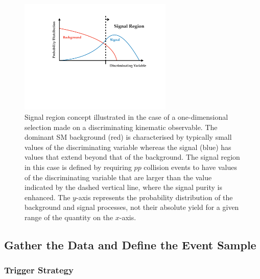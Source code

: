 \begin{figure}[!htb]
    \begin{center}
        \includegraphics[width=0.65\textwidth]{figures/common_ana/sr_search_vPDF}
        \caption{
            Signal region concept illustrated in the case of a one-dimensional selection
            made on a discriminating kinematic observable.
            The dominant SM background (red) is characterised by typically small values
            of the discriminating variable whereas the signal (blue) has values that extend
            beyond that of the background.
            The signal region in this case is defined by requiring $pp$ collision events
            to have values of the discriminating variable that are larger than
            the value indicated by the dashed vertical line, where the signal purity is
            enhanced.
            The $y$-axis represents the probability distribution of the background and signal
            processes, not their absolute yield for a given range of the quantity on the $x$-axis.
        }
        \label{fig:sr_search_v}
    \end{center}
\end{figure}



\FloatBarrier
\subsection{Gather the Data and Define the Event Sample}
\label{sec:gather_data}

\subsubsection{Trigger Strategy}


